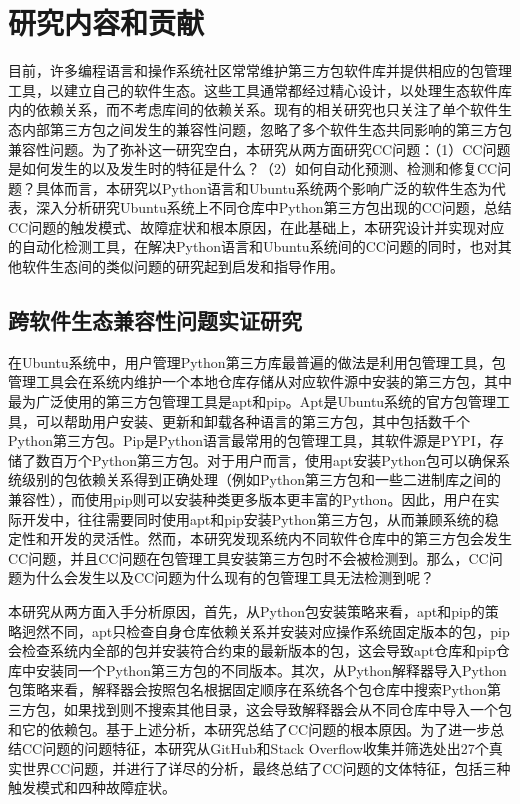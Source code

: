 \section{研究内容和贡献}
目前，许多编程语言和操作系统社区常常维护第三方包软件库并提供相应的包管理工具，以建立自己的软件生态。这些工具通常都经过精心设计，以处理生态软件库内的依赖关系，而不考虑库间的依赖关系。现有的相关研究也只关注了单个软件生态内部第三方包之间发生的兼容性问题，忽略了多个软件生态共同影响的第三方包兼容性问题。为了弥补这一研究空白，本研究从两方面研究CC问题：（1）CC问题是如何发生的以及发生时的特征是什么？（2）如何自动化预测、检测和修复CC问题？具体而言，本研究以Python语言和Ubuntu系统两个影响广泛的软件生态为代表，深入分析研究Ubuntu系统上不同仓库中Python第三方包出现的CC问题，总结CC问题的触发模式、故障症状和根本原因，在此基础上，本研究设计并实现对应的自动化检测工具，在解决Python语言和Ubuntu系统间的CC问题的同时，也对其他软件生态间的类似问题的研究起到启发和指导作用。
\subsection{跨软件生态兼容性问题实证研究}\label{1.3.1}
在Ubuntu系统中，用户管理Python第三方库最普遍的做法是利用包管理工具，包管理工具会在系统内维护一个本地仓库存储从对应软件源中安装的第三方包，其中最为广泛使用的第三方包管理工具是apt和pip。Apt是Ubuntu系统的官方包管理工具，可以帮助用户安装、更新和卸载各种语言的第三方包，其中包括数千个Python第三方包。Pip是Python语言最常用的包管理工具，其软件源是PYPI，存储了数百万个Python第三方包。对于用户而言，使用apt安装Python包可以确保系统级别的包依赖关系得到正确处理（例如Python第三方包和一些二进制库之间的兼容性），而使用pip则可以安装种类更多版本更丰富的Python。因此，用户在实际开发中，往往需要同时使用apt和pip安装Python第三方包，从而兼顾系统的稳定性和开发的灵活性。然而，本研究发现系统内不同软件仓库中的第三方包会发生CC问题，并且CC问题在包管理工具安装第三方包时不会被检测到。那么，CC问题为什么会发生以及CC问题为什么现有的包管理工具无法检测到呢？

本研究从两方面入手分析原因，首先，从Python包安装策略来看，apt和pip的策略迥然不同，apt只检查自身仓库依赖关系并安装对应操作系统固定版本的包，pip会检查系统内全部的包并安装符合约束的最新版本的包，这会导致apt仓库和pip仓库中安装同一个Python第三方包的不同版本。其次，从Python解释器导入Python包策略来看，解释器会按照包名根据固定顺序在系统各个包仓库中搜索Python第三方包，如果找到则不搜索其他目录，这会导致解释器会从不同仓库中导入一个包和它的依赖包。基于上述分析，本研究总结了CC问题的根本原因。为了进一步总结CC问题的问题特征，本研究从GitHub和Stack Overflow收集并筛选处出27个真实世界CC问题，并进行了详尽的分析，最终总结了CC问题的文体特征，包括三种触发模式和四种故障症状。

